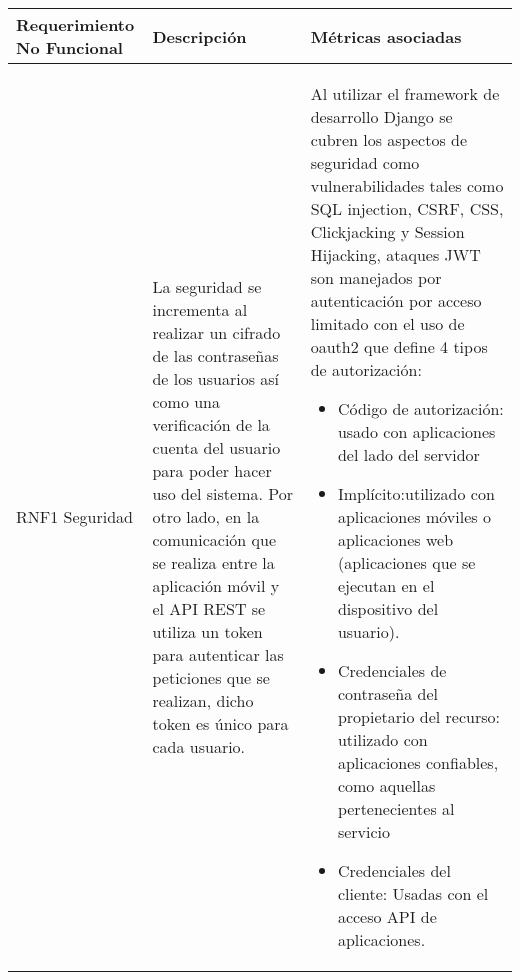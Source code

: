 \begin{tabularx}{1.0\textwidth} { 
 		| >{\raggedright\arraybackslash}X 
 		| >{\arraybackslash}X 
 		| >{\raggedright\arraybackslash}X | }
 	\hline
 	
 	Requerimiento No Funcional & Descripción & Métricas asociadas  \\
 	\hline
 	RNF1 Seguridad  &  La seguridad se incrementa al realizar un cifrado de las contraseñas de los usuarios así como una verificación de la cuenta del usuario para poder hacer uso del sistema. Por otro lado, en la comunicación que se realiza entre la aplicación móvil y el API REST se utiliza un token para autenticar las peticiones que se realizan, dicho token es único para cada usuario.  &    Al utilizar el framework de desarrollo Django se cubren los aspectos de seguridad como vulnerabilidades tales como SQL injection, CSRF, CSS, Clickjacking y Session Hijacking, ataques JWT son manejados por autenticación por acceso limitado con el uso de oauth2 que define 4 tipos de autorización: 
 	\begin{itemize}
 		\item Código de autorización: usado con aplicaciones del lado del servidor
 		 \item Implícito:utilizado con aplicaciones móviles o aplicaciones web (aplicaciones que se ejecutan en el dispositivo del usuario).

 		 \item Credenciales de contraseña del propietario del recurso: utilizado con aplicaciones confiables, como aquellas pertenecientes al servicio
 		 \item Credenciales del cliente: Usadas con el acceso API de aplicaciones.
 		\end{itemize} \\
 	\hline

 \end{tabularx}
